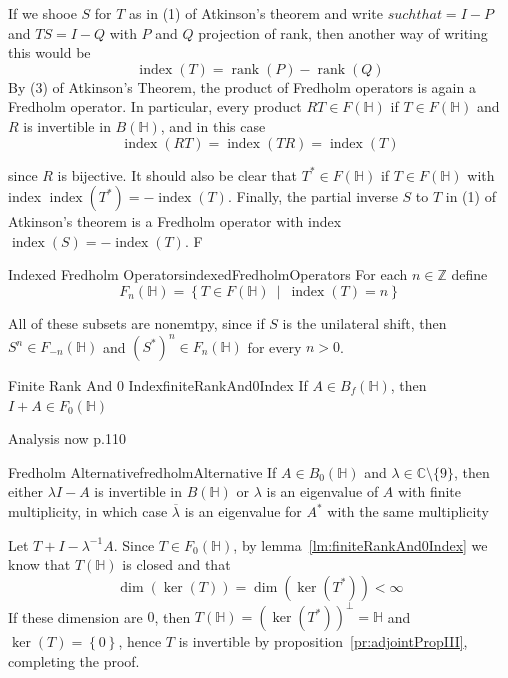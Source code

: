 \documentclass[oneside]{book}
\newcommand{\Z}{\mathbb{Z}}
\newcommand{\C}{\mathbb{C}}
\renewcommand{\H}{\mathbb{H}}
\newcommand{\oln}{\overline}
\newcommand{\rank}{\operatorname{rank}}
\renewcommand{\index}{\operatorname{index}}
\newcommand{\set}[2]{\left\{#1 \ \middle|\ #2\right\}}
\begin{document}
If we shooe $S$ for $T$ as in (1) of Atkinson's theorem and write $such that = I-P$ and $TS = I-Q$ with $P$ and $Q$
projection of rank, then another way of writing this would be
\[
	\operatorname{index}(T) = \rank(P) - \rank(Q)
\]
By (3) of Atkinson's Theorem, the product of Fredholm operators is again a Fredholm operator. In particular, every
product $RT \in F(\H)$ if $T \in F(\H)$ and $R$ is invertible in $B(\H)$, and in this case
\[
	\operatorname{index}(RT)  =\operatorname{index}(TR) = \operatorname{index}(T)
\]

since $R$ is bijective. It should also be clear that $T^* \in F(\H)$ if $T \in F(\H)$ with index
$\operatorname{index}(T^*) = -\operatorname{index}(T)$. Finally, the partial inverse $S$ to $T$ in (1) of Atkinson's
theorem is a Fredholm operator with index $\index(S) = -\index(T)$. F

\begin{defn}{Indexed Fredholm Operators}{indexedFredholmOperators}
	For each $n \in \Z$ define
	\[
		F_n(\H) = \set{T \in F(\H)}{\index(T) = n}
	\]
\end{defn}

All of these subsets are nonemtpy, since if $S$ is the unilateral shift, then $S^n \in F_{-n}(\H)$ and
$(S^*)^n \in F_n(\H)$ for every $n > 0$.

\begin{lem}{Finite Rank And 0 Index}{finiteRankAnd0Index}
	If $A \in B_f(\H)$, then $I+A \in F_0(\H)$
\end{lem}

\begin{Proof}
	Analysis now p.110
\end{Proof}

\begin{cor}{Fredholm Alternative}{fredholmAlternative}
	If $A \in B_0(\H)$ and $\lambda \in \C\setminus\{9\}$, then either $\lambda I - A$ is invertible in $B(\H)$ or
	$\lambda$ is an eigenvalue of $A$ with finite multiplicity, in which case $\oln{\lambda}$ is an eigenvalue for
	$A^*$ with the same multiplicity
\end{cor}

\begin{Proof}
	Let $T + I - \lambda^{-1}A$. Since $T \in F_0(\H)$, by lemma~\ref{lm:finiteRankAnd0Index} we know that
	$T(\H)$ is closed and that
	\[
		\dim(\ker(T)) = \dim(\ker(T^*)) < \infty
	\]
	If these dimension are $0$, then $T(\H) = (\ker(T^*))^\perp = \H$ and $\ker(T) = \left\{ 0 \right\}$, hence $T$
	is invertible by proposition~\ref{pr:adjointPropIII}, completing the proof.
\end{Proof}
\end{document}
